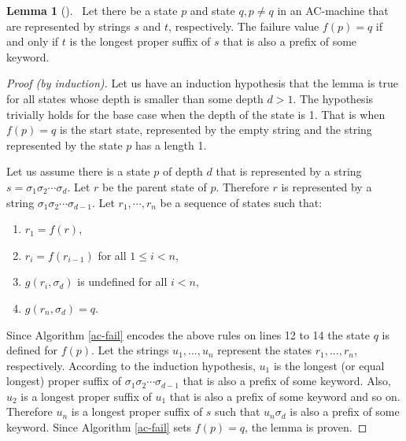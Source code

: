 \documentclass[english,twoside,censored,csm,algorithms-track-2020]{HYthesisML}
\theoremstyle{plain}
\theoremstyle{definition}
\newtheorem{lemma}[theorem]{Lemma}
\numberwithin{testexample}{chapter}
\begin{document}
\begin{lemma}[]~\label{lem-overlap}
  Let there be a state $p$ and state $q, p\neq q$ in an AC-machine that are represented by strings
  $s$ and $t$, respectively. The failure value $f(p) = q$ if and only if $t$ is the longest proper suffix
  of $s$ that is also a prefix of some keyword.
\end{lemma}
\begin{proof}[Proof (by induction)]
  Let us have an induction hypothesis that the lemma is true for all states whose depth is smaller
  than some depth $d > 1$. The hypothesis trivially holds for the base case when the
  depth of the state is 1. That is when $f(p) = q$ is the start state, represented by the empty
  string and the string represented by the state $p$ has a length 1.
  
  Let us assume there is a state $p$ of depth $d$ that is represented by a string
  $s=\sigma_1\sigma_2\cdots \sigma_d$. Let $r$ be the parent state of $p$. Therefore $r$ is represented by a
  string $\sigma_1\sigma_2\cdots \sigma_{d-1}$. Let $r_1,\cdots ,r_n$ be a sequence of states such that:

  \begin{enumerate}[leftmargin=28pt]
  \item $r_1 = f(r)$,
  \item $r_i = f(r_{i-1})$ for all $ 1 \leq i < n$,
  \item $g(r_i, \sigma_d)$ is undefined for all $i < n$,
  \item $g(r_n, \sigma_d) = q$.
  \end{enumerate}

  Since Algorithm \ref{ac-fail} encodes the above rules on lines 12 to 14 the state $q$ is defined
  for $f(p)$. Let the strings $u_1,...,u_n$ represent the states $r_1,...,r_n$, respectively.
  According to the induction hypothesis, $u_1$ is the longest (or equal longest) proper suffix of $\sigma_1\sigma_2\cdots \sigma_{d-1}$
  that is also a prefix of some keyword. Also, $u_2$ is a longest proper suffix of $u_1$ that is also
  a prefix of some keyword and so on. Therefore $u_n$ is a longest proper suffix of $s$ such that
  $u_n\sigma_d$ is also a prefix of some keyword. Since Algorithm \ref{ac-fail} sets $f(p) = q$,
  the lemma is proven.
  
\end{proof}  
\end{document}
